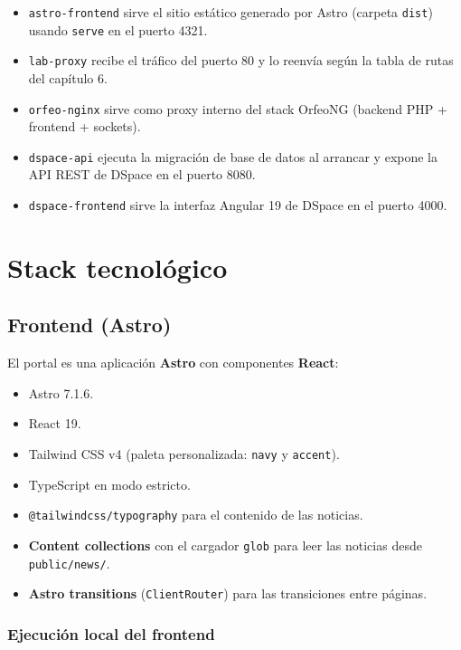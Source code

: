 \documentclass[12pt,a4paper]{report}
\begin{document}
\begin{itemize}
  \item \texttt{astro-frontend} sirve el sitio estático generado por Astro
        (carpeta \texttt{dist}) usando \texttt{serve} en el puerto 4321.
  \item \texttt{lab-proxy} recibe el tráfico del puerto 80 y lo reenvía según
        la tabla de rutas del capítulo 6.
  \item \texttt{orfeo-nginx} sirve como proxy interno del stack OrfeoNG
        (backend PHP + frontend + sockets).
  \item \texttt{dspace-api} ejecuta la migración de base de datos al arrancar
        y expone la API REST de DSpace en el puerto 8080.
  \item \texttt{dspace-frontend} sirve la interfaz Angular 19 de DSpace en el
        puerto 4000.
\end{itemize}

\chapter{Stack tecnológico}

\section{Frontend (Astro)}

El portal es una aplicación \textbf{Astro} con componentes \textbf{React}:

\begin{itemize}
  \item Astro 7.1.6.
  \item React 19.
  \item Tailwind CSS v4 (paleta personalizada: \texttt{navy} y \texttt{accent}).
  \item TypeScript en modo estricto.
  \item \texttt{@tailwindcss/typography} para el contenido de las noticias.
  \item \textbf{Content collections} con el cargador \texttt{glob} para leer
        las noticias desde \texttt{public/news/}.
  \item \textbf{Astro transitions} (\texttt{ClientRouter}) para las
        transiciones entre páginas.
\end{itemize}

\subsection{Ejecución local del frontend}
\end{document}
